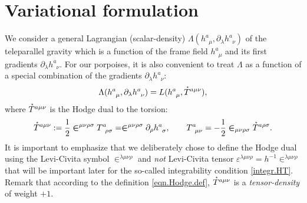 \documentclass[
10pt, %
a4paper, %
oneside, %
headinclude,footinclude, %
BCOR5mm, %
]{scrartcl}
\newcommand{\IP}[1]{{\color{Red}[IP:\ \ #1]}}
\newcommand{\pd}[1]{\partial_{#1}}
\newcommand{\tetrsymbol}{h}
\newcommand{\tetr}[2]{\tetrsymbol^{#1}_{\phantom{#1}#2}}
\newcommand{\detTetr}{\tetrsymbol}
\newcommand{\D}[1]{\partial_{#1}} %
\newcommand{\Tors}[2]{T^{#1}_{\phantom{a}#2}}
\newcommand{\Lag}{\Lambda}	%
\newcommand{\Laghodge}{L}%
\newcommand{\LCsymb}{\bm{\in}}    %
\newcommand{\LCtens}{\varepsilon} %
\newcommand{\HDT}[1]{\accentset{\star}{T}^{#1}}
\begin{document}
%


\section{Variational formulation}


We consider a general Lagrangian (scalar-density) $ \Lag(\tetr{a}{\mu},\pd{\lambda}\tetr{a}{\nu}) $ 
of the teleparallel gravity which is a function of the frame field $ \tetr{a}{\mu} $ and its first 
gradients $ \pd{\lambda}\tetr{a}{\nu} $. For our porpoises, it is also convenient to treat $ 
\Lag $ as a function of a special combination of the gradients $ \pd{\lambda}\tetr{a}{\nu} $:
\begin{equation}\label{eqn.Lagrangians}
\Lag(\tetr{a}{\mu},\pd{\lambda}\tetr{a}{\nu}) = 
\Laghodge(\tetr{a}{\mu},\HDT{a\mu\nu}),
\end{equation}
where $ \HDT{a\mu\nu} $ is the Hodge dual to the 
torsion:
\begin{equation}\label{eqn.Hodge.def}
\HDT{a\mu\nu} := \frac{1}{2}\LCsymb^{\mu\nu\rho\sigma}\Tors{a}{\rho\sigma} = 
\LCsymb^{\mu\nu\rho\sigma}\D{\rho}\tetr{a}{\sigma}, \qquad \Tors{a}{\mu\nu} = 
-\frac{1}{2}\LCsymb_{\mu\nu\rho\sigma}\HDT{a\rho\sigma}.
\end{equation}
It is important to emphasize that we deliberately chose to define the Hodge dual using the 
Levi-Civita symbol $ 
\LCsymb^{\lambda\mu\nu\rho} $ and \emph{not} Levi-Civita tensor $ \LCtens^{\lambda\mu\nu\rho} = 
\detTetr^{-1} 
\LCsymb^{\lambda\mu\nu\rho} $ that will be important later for 
the so-called integrability condition \eqref{integr.HT}.
Remark that according to the definition \eqref{eqn.Hodge.def}, $ \HDT{a\mu\nu} $ is a  
\emph{tensor-density} of weight $ +1 $.
\end{document}
